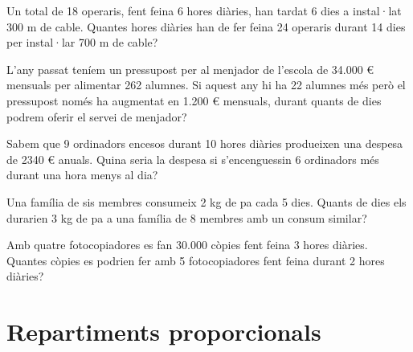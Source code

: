  
 \begin{mylist}
 	

\exer
  Un total de 18 operaris, fent feina 6 hores diàries, han tardat 6 dies
  a instal·lat 300 m de cable. Quantes hores diàries han de fer feina 24
  operaris durant 14 dies per instal·lar 700 m de cable?


\exer
  L'any passat teníem un pressupost per al menjador de l'escola de
  34.000 \euro{} mensuals per alimentar 262 alumnes. Si aquest any hi ha
  22 alumnes més però el pressupost només ha augmentat en 1.200 \euro{}
  mensuals, durant quants de dies podrem oferir el servei de menjador?

\exer
  Sabem que 9 ordinadors encesos durant 10 hores diàries produeixen una
  despesa de 2340 \euro{} anuals. Quina seria la despesa si
  s'encenguessin 6 ordinadors més durant una hora menys al dia?


\exer
  Una família de sis membres consumeix 2 kg de pa cada 5 dies. Quants de
  dies els durarien 3 kg de pa a una família de 8 membres amb un consum
  similar?


\exer
  Amb quatre fotocopiadores es fan 30.000 còpies fent feina 3 hores
  diàries. Quantes còpies es podrien fer amb 5 fotocopiadores fent feina
  durant 2 hores diàries?


\end{mylist}


\section{Repartiments proporcionals}

